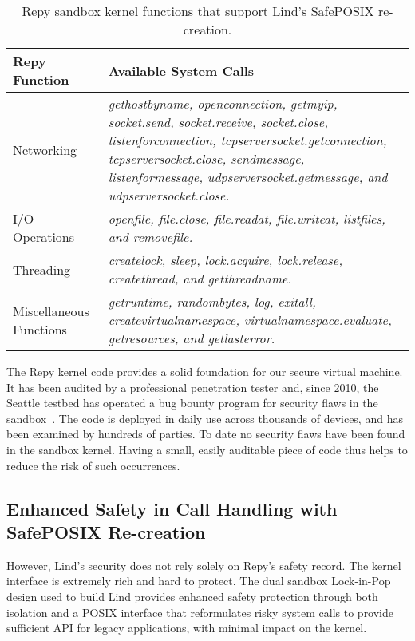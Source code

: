 \begin{table}
\centering
\caption {Repy sandbox kernel functions that support Lind's SafePOSIX re-creation.}

  \begin{tabular}{ | p{2.5cm} | p{4.5cm} |}
  \hline
  \textbf{Repy Function} & \textbf{Available System Calls}  \\ \hline

Networking & \emph{gethostbyname, openconnection, getmyip, socket.send, socket.receive, socket.close,
listenforconnection, tcpserversocket.getconnection, tcpserversocket.close, sendmessage, listenformessage,
udpserversocket.getmessage, and udpserversocket.close.} \\ \hline

I/O Operations & \emph{openfile, file.close, file.readat, file.writeat, listfiles, and removefile.} \\ \hline

Threading & \emph{createlock, sleep, lock.acquire, lock.release, createthread, and getthreadname.} \\ \hline

Miscellaneous Functions & \emph{getruntime, randombytes, log, exitall, createvirtualnamespace,
virtualnamespace.evaluate, getresources, and getlasterror.}  \\ \hline
    \end{tabular}
    \label{table:RepyKernel}
\end{table}

The Repy kernel code provides a solid foundation for our secure virtual
machine. It has been audited by a professional penetration tester and, since 2010,
the Seattle testbed has operated a bug bounty program for security flaws in the
sandbox~\cite{seattle}.
The code is deployed in daily use across thousands of devices, and has been examined by
hundreds of parties. To date no security flaws have been found in the sandbox
kernel. Having a small, easily auditable piece of code thus helps to reduce the
risk of such occurrences.

\subsection{Enhanced Safety in Call Handling with SafePOSIX Re-creation}

However, Lind's security does not rely solely on Repy's
safety record.
The kernel interface is extremely rich and hard to protect.
The dual sandbox Lock-in-Pop design used to build Lind provides enhanced
safety protection through both isolation and a POSIX interface that
reformulates risky system calls to
provide sufficient API for legacy applications, with minimal impact on the kernel.

